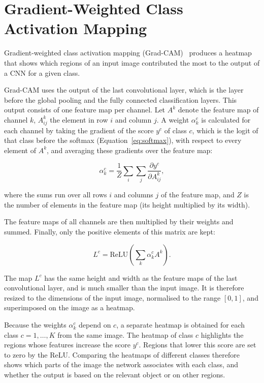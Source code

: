 \section{Gradient-Weighted Class Activation Mapping}\label{sec:gradcam_background}

Gradient-weighted class activation mapping (Grad-CAM)~\citep{selvaraju2017gradcam} produces a heatmap that shows which regions of an input image contributed the most to the output of a CNN for a given class.

Grad-CAM uses the output of the last convolutional layer, which is the layer before the global pooling and the fully connected classification layers. This output consists of one feature map per channel. Let $A^k$ denote the feature map of channel $k$, $A^k_{ij}$ the element in row $i$ and column $j$. A weight $\alpha_k^c$ is calculated for each channel by taking the gradient of the score $y^c$ of class $c$, which is the logit of that class before the softmax (Equation~\ref{eq:softmax}), with respect to every element of $A^k$, and averaging these gradients over the feature map:

\begin{equation}
    \alpha_k^c = \frac{1}{Z} \sum_{i} \sum_{j} \frac{\partial y^c}{\partial A^k_{ij}},
    \label{eq:gradcam_weights}
\end{equation}

where the sums run over all rows $i$ and columns $j$ of the feature map, and $Z$ is the number of elements in the feature map (its height multiplied by its width).

The feature maps of all channels are then multiplied by their weights and summed. Finally, only the positive elements of this matrix are kept:

\begin{equation}
    L^c = \mathrm{ReLU}\left( \sum_{k} \alpha_k^c A^k \right).
    \label{eq:gradcam_map}
\end{equation}

The map $L^c$ has the same height and width as the feature maps of the last convolutional layer, and is much smaller than the input image. It is therefore resized to the dimensions of the input image, normalised to the range $[0, 1]$, and superimposed on the image as a heatmap.

Because the weights $\alpha_k^c$ depend on $c$, a separate heatmap is obtained for each class $c = 1, \dots, K$ from the same image. The heatmap of class $c$ highlights the regions whose features increase the score $y^c$. Regions that lower this score are set to zero by the ReLU. Comparing the heatmaps of different classes therefore shows which parts of the image the network associates with each class, and whether the output is based on the relevant object or on other regions.

